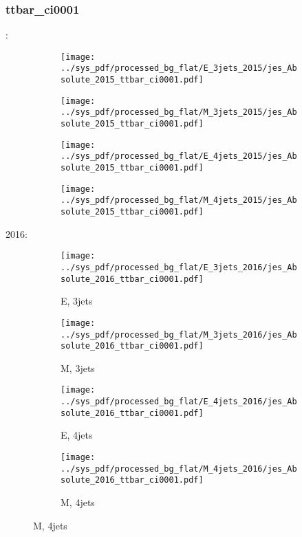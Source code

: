 \documentclass{beamer}
\begin{document}
\begin{frame}
\frametitle{ttbar_ci0001}
\fontsize{5}{1}:
\begin{figure}
\centering
\begin{subfigure}[b]{0.24\textwidth}
\texttt{[image: ../sys\_pdf/processed\_bg\_flat/E\_3jets\_2015/jes\_Absolute\_2015\_ttbar\_ci0001.pdf]}
\end{subfigure}
\begin{subfigure}[b]{0.24\textwidth}
\texttt{[image: ../sys\_pdf/processed\_bg\_flat/M\_3jets\_2015/jes\_Absolute\_2015\_ttbar\_ci0001.pdf]}
\end{subfigure}
\begin{subfigure}[b]{0.24\textwidth}
\texttt{[image: ../sys\_pdf/processed\_bg\_flat/E\_4jets\_2015/jes\_Absolute\_2015\_ttbar\_ci0001.pdf]}
\end{subfigure}
\begin{subfigure}[b]{0.24\textwidth}
\texttt{[image: ../sys\_pdf/processed\_bg\_flat/M\_4jets\_2015/jes\_Absolute\_2015\_ttbar\_ci0001.pdf]}
\end{subfigure}
\end{figure}
2016:
\begin{figure}
\centering
\begin{subfigure}[b]{0.24\textwidth}
\texttt{[image: ../sys\_pdf/processed\_bg\_flat/E\_3jets\_2016/jes\_Absolute\_2016\_ttbar\_ci0001.pdf]}
\captionsetup{font=tiny}
\caption{E, 3jets}
\end{subfigure}
\begin{subfigure}[b]{0.24\textwidth}
\texttt{[image: ../sys\_pdf/processed\_bg\_flat/M\_3jets\_2016/jes\_Absolute\_2016\_ttbar\_ci0001.pdf]}
\captionsetup{font=tiny}
\caption{M, 3jets}
\end{subfigure}
\begin{subfigure}[b]{0.24\textwidth}
\texttt{[image: ../sys\_pdf/processed\_bg\_flat/E\_4jets\_2016/jes\_Absolute\_2016\_ttbar\_ci0001.pdf]}
\captionsetup{font=tiny}
\caption{E, 4jets}
\end{subfigure}
\begin{subfigure}[b]{0.24\textwidth}
\texttt{[image: ../sys\_pdf/processed\_bg\_flat/M\_4jets\_2016/jes\_Absolute\_2016\_ttbar\_ci0001.pdf]}
\captionsetup{font=tiny}
\caption{M, 4jets}
\end{subfigure}
\end{figure}
\end{frame}
\end{document}
